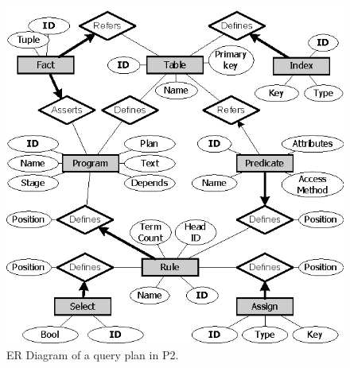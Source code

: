 \documentclass{sigmod08}
\begin{document}

\begin{figure}
\begin{center}
\includegraphics{visio/ERDiagram}
\caption{{ER Diagram of a query plan in P2.}}
\label{fig:p2er}
\end{center}
\end{figure}
\end{document}
